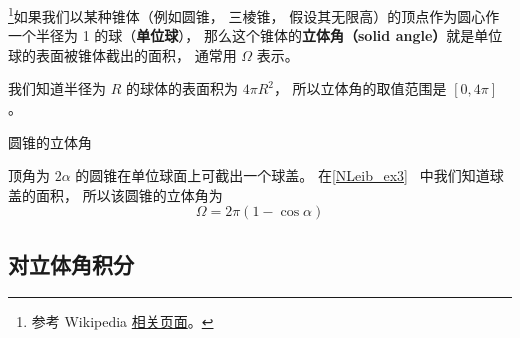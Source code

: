 
\begin{issues}
\issueTODO
\end{issues}


\footnote{参考 Wikipedia \href{https://en.wikipedia.org/wiki/Solid_angle}{相关页面}。}如果我们以某种锥体（例如圆锥， 三棱锥， 假设其无限高）的顶点作为圆心作一个半径为 1 的球（\textbf{单位球}）， 那么这个锥体的\textbf{立体角（solid angle）}就是单位球的表面被锥体截出的面积， 通常用 $\Omega$ 表示。

我们知道半径为 $R$ 的球体的表面积为 $4\pi R^2$， 所以立体角的取值范围是 $[0, 4\pi]$。

\begin{example}{圆锥的立体角}

顶角为 $2\alpha$ 的圆锥在单位球面上可截出一个球盖。 在\autoref{NLeib_ex3}~ 中我们知道球盖的面积， 所以该圆锥的立体角为
\begin{equation}
\Omega = 2\pi (1 - \cos\alpha)
\end{equation}
\end{example}

\subsection{对立体角积分}
